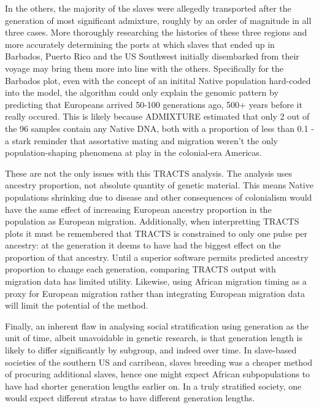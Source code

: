 \documentclass[11pt]{article}
\begin{document}
In the others, the majority of the slaves were allegedly transported after the generation of most significant admixture, roughly by an order of magnitude in all three cases. More thoroughly researching the histories of these three regions and more accurately determining the ports at which slaves that ended up in Barbados, Puerto Rico and the US Southwest initially disembarked from their voyage may bring them more into line with the others. Specifically for the Barbados plot, even with the concept of an initital Native population hard-coded into the model, the algorithm could only explain the genomic pattern by predicting that Europeans arrived 50-100 generations ago, 500+ years before it really occured. This is likely because ADMIXTURE estimated that only 2 out of the 96 samples contain any Native DNA, both with a proportion of less than 0.1 - a stark reminder that assortative mating and migration weren't the only population-shaping phenomena at play in the colonial-era Americas.

These are not the only issues with this TRACTS analysis. The analysis uses ancestry proportion, not absolute quantity of genetic material. This means Native populations shrinking due to disease and other consequences of colonialism would have the same effect of increasing European ancestry proportion in the population as European migration. Additionally, when interpretting TRACTS plots it must be remembered that TRACTS is constrained to only one pulse per ancestry: at the generation it deems to have had the biggest effect on the proportion of that ancestry. Until a superior software permits predicted ancestry proportion to change each generation, comparing TRACTS output with migration data has limited utility. Likewise, using African migration timing as a proxy for European migration rather than integrating European migration data will limit the potential of the method.

Finally, an inherent flaw in analysing social stratification using generation as the unit of time, albeit unavoidable in genetic research, is that generation length is likely to differ significantly by subgroup, and indeed over time. In slave-based societies of the southern US and carribean, slaves breeding was a cheaper method of procuring additional slaves, hence one might expect African subpopulations to have had shorter generation lengths earlier on. In a truly stratified society, one would expect different stratas to have different generation lengths. 
\end{document}
